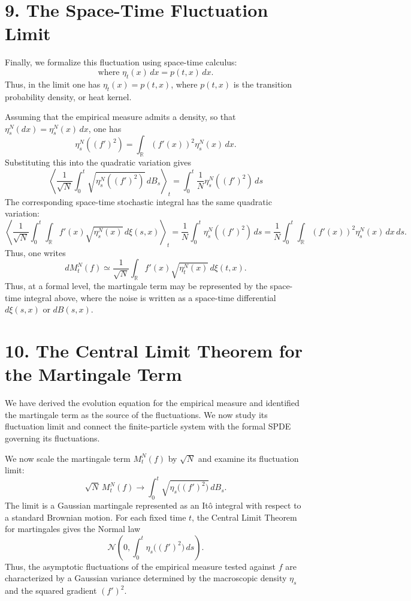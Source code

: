 \documentclass[11pt]{article}
\theoremstyle{definition}
\theoremstyle{remark}
\begin{document}
\section*{9. The Space-Time Fluctuation Limit}
Finally, we formalize this fluctuation using space-time calculus:
\[
\text{where }\eta_t(x)\,dx=p(t,x)\,dx.
\]
Thus, in the limit one has $\eta_t(x)=p(t,x)$, where $p(t,x)$ is the transition probability density, or heat kernel.

Assuming that the empirical measure admits a density, so that $\eta_s^N(dx)=\eta_s^N(x)\,dx$, one has
\[
\eta_s^N((f')^2)=\int_{\mathbb R} (f'(x))^2 \eta_s^N(x)\,dx.
\]
Substituting this into the quadratic variation gives
\[
\left\langle
\frac{1}{\sqrt{N}}\int_0^t \sqrt{\eta_s^N((f')^2)}\,dB_s
\right\rangle_t
=
\int_0^t \frac{1}{N}\eta_s^N((f')^2)\,ds
\]
The corresponding space-time stochastic integral has the same quadratic variation:
\[
\left\langle
\frac{1}{\sqrt{N}}\int_0^t \int_{\mathbb R} f'(x)\sqrt{\eta_s^N(x)}\,d\xi(s,x)
\right\rangle_t
=
\frac{1}{N}\int_0^t \eta_s^N((f')^2)\,ds
=
\frac{1}{N}\int_0^t \int_{\mathbb R} (f'(x))^2 \eta_s^N(x)\,dx\,ds.
\]
Thus, one writes
\[
dM_t^N(f)\simeq \frac{1}{\sqrt{N}}\int_{\mathbb R} f'(x)\sqrt{\eta_t^N(x)}\,d\xi(t,x).
\]
Thus, at a formal level, the martingale term may be represented by the space-time integral above, where the noise is written as a space-time differential $d\xi(s,x)$ or $dB(s,x)$.

\section*{10. The Central Limit Theorem for the Martingale Term}
We have derived the evolution equation for the empirical measure and identified the martingale term as the source of the fluctuations. We now study its fluctuation limit and connect the finite-particle system with the formal SPDE governing its fluctuations.

We now scale the martingale term $M_t^N(f)$ by $\sqrt{N}$ and examine its fluctuation limit:
\[
\sqrt{N}\,M_t^N(f)\to \int_0^t \sqrt{\eta_s\bigl((f')^2\bigr)}\,dB_s.
\]
The limit is a Gaussian martingale represented as an It\^o integral with respect to a standard Brownian motion. For each fixed time $t$, the Central Limit Theorem for martingales gives the Normal law
\[
\mathcal N\!\left(0,\int_0^t \eta_s\bigl((f')^2\bigr)\,ds\right).
\]
Thus, the asymptotic fluctuations of the empirical measure tested against $f$ are characterized by a Gaussian variance determined by the macroscopic density $\eta_s$ and the squared gradient $(f')^2$.
\end{document}
